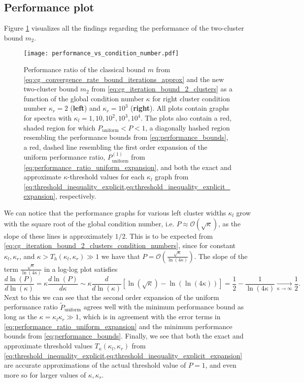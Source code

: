 \subsection{Performance plot}
Figure \ref{fig:two_cluster_bound_performance} visualizes all the findings regarding the performance of the two-cluster bound $m_2$. 
\begin{figure}[H]
    \centering
    \texttt{[image: performance\_vs\_condition\_number.pdf]}
    \caption{Performance ratio of the classical bound $m$ from \cref{eq:cg_convergence_rate_bound_iterations_approx} and the new two-cluster bound $m_2$ from \cref{eq:cg_iteration_bound_2_clusters} as a function of the global condition number $\kappa$ for right cluster condition number $\kappa_r = 2$ (\textbf{left}) and $\kappa_r = 10^3$ (\textbf{right}). All plots contain graphs for spectra with $\kappa_l = 1, 10, 10^2, 10^3, 10^4$. The plots also contain a red, shaded region for which $P_{\text{uniform}} < P < 1$, a diagonally hashed region resembling the performance bounds from \cref{eq:performance_bounds}, a red, dashed line resembling the first order expansion of the uniform performance ratio, $P^{(1)}_{\text{uniform}}$ from \cref{eq:performance_ratio_uniform_expansion}, and both the exact and approximate $\kappa$-threshold values for each $\kappa_l$ graph from \cref{eq:threshold_inequality_explicit,eq:threshold_inequality_explicit_expansion}, respectively.}
    \label{fig:two_cluster_bound_performance}
\end{figure}
We can notice that the performance graphs for various left cluster widths $\kappa_l$ grow with the square root of the global condition number, i.e. $P \approx \mathcal{O}(\sqrt{\kappa})$, as the slope of these lines is approximately $1/2$. This is to be expected from \cref{eq:cg_iteration_bound_2_clusters_condition_numbers}, since for constant $\kappa_l,\kappa_r$, and $\kappa > T_h(\kappa_l, \kappa_r) \gg 1$ we have that $P = \mathcal{O}\left(\frac{\sqrt{\kappa}}{\ln(4\kappa)}\right)$. The slope of the term $\frac{\sqrt{\kappa}}{\ln(4\kappa)}$ in a log-log plot satisfies
\[
    \frac{d\ln(P)}{d\ln(\kappa)} =\kappa\frac{d\ln(P)}{d\kappa} \sim \kappa\frac{d}{d\ln(\kappa)} \left[\ln(\sqrt{\kappa}) - \ln(\ln(4\kappa))\right] = \frac{1}{2} - \frac{1}{\ln(4\kappa)} \underset{\kappa\to\infty}{\longrightarrow} \frac{1}{2}.
\]
Next to this we can see that the second order expansion of the uniform performance ratio $\tilde{P}_{\text{uniform}}$ agrees well with the minimum performance bound as long as the $\kappa = \kappa_l\kappa_r \gg 1$, which is in agreement with the error terms in \cref{eq:performance_ratio_uniform_expansion} and the minimum performance bounds from \cref{eq:performance_bounds}. Finally, we see that both the exact and approximate threshold values $T_{\kappa}(\kappa_l, \kappa_r)$ from \cref{eq:threshold_inequality_explicit,eq:threshold_inequality_explicit_expansion} are accurate approximations of the actual threshold value of $P=1$, and even more so for larger values of $\kappa,\kappa_r$.

